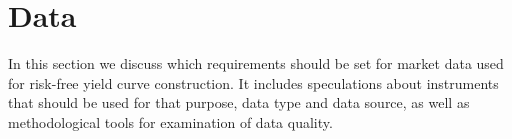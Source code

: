 \section{Data}

In this section we discuss which requirements should be set for market data used for risk-free yield curve construction. It includes  speculations about instruments that should be used for that purpose, data type and data source, as well as methodological tools for examination of data quality. 

